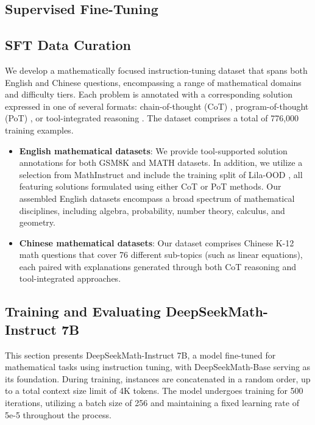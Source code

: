 \begin{itemize}[topsep=0pt]
\section{Supervised Fine-Tuning}

\subsection{SFT Data Curation}

We develop a mathematically focused instruction-tuning dataset that spans both English and Chinese questions, encompassing a range of mathematical domains and difficulty tiers. Each problem is annotated with a corresponding solution expressed in one of several formats: chain-of-thought (CoT) \citep{cot}, program-of-thought (PoT) \citep{pot,pal}, or tool-integrated reasoning \citep{tora}. The dataset comprises a total of 776,000 training examples.

\begin{itemize}[topsep=0pt]
    \item \textbf{English mathematical datasets}: We provide tool-supported solution annotations for both GSM8K and MATH datasets. In addition, we utilize a selection from MathInstruct \citep{MathInstruct} and include the training split of Lila-OOD \citep{lila}, all featuring solutions formulated using either CoT or PoT methods. Our assembled English datasets encompass a broad spectrum of mathematical disciplines, including algebra, probability, number theory, calculus, and geometry.
    \item \textbf{Chinese mathematical datasets}: Our dataset comprises Chinese K-12 math questions that cover 76 different sub-topics (such as linear equations), each paired with explanations generated through both CoT reasoning and tool-integrated approaches.
\end{itemize}

\subsection{Training and Evaluating DeepSeekMath-Instruct 7B}

This section presents DeepSeekMath-Instruct 7B, a model fine-tuned for mathematical tasks using instruction tuning, with DeepSeekMath-Base serving as its foundation. During training, instances are concatenated in a random order, up to a total context size limit of 4K tokens. The model undergoes training for 500 iterations, utilizing a batch size of 256 and maintaining a fixed learning rate of 5e-5 throughout the process.


\end{itemize}
